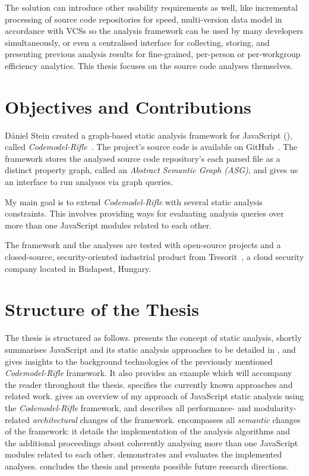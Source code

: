 The solution can introduce other usability requirements as well, like incremental processing of source code repositories for speed, multi-version data model in accordance with VCSs so the analysis framework can be used by many developers simultaneously, or even a centralised interface for collecting, storing, and presenting previous analysis results for fine-grained, per-person or per-workgroup efficiency analytics. This thesis focuses on the source code analyses themselves.


\section{Objectives and Contributions}

Dániel Stein created a graph-based static analysis framework for JavaScript (\es), called \emph{Codemodel-Rifle}~\cite{stein-daniel-msc}. The project's source code is available on GitHub~\cite{codemodel-rifle-github}. The framework stores the analysed source code repository's each parsed file as a distinct property graph, called an \emph{Abstract Semantic Graph (ASG)}, and gives us an interface to run analyses via graph queries.

My main goal is to extend \emph{Codemodel-Rifle} with several static analysis constraints. This involves providing ways for evaluating analysis queries over more than one JavaScript modules related to each other.

The framework and the analyses are tested with open-source projects and a closed-source, security-oriented industrial product from Tresorit~\cite{tresorit}, a cloud security company located in Budapest, Hungary.


\section{Structure of the Thesis}

The thesis is structured as follows. \emph{} presents the concept of static analysis, shortly summarises JavaScript and its static analysis approaches to be detailed in , and gives insights to the background technologies of the previously mentioned \emph{Codemodel-Rifle} framework. It also provides an example which will accompany the reader throughout the thesis. \emph{} specifies the currently known approaches and related work. \emph{} gives an overview of my approach of JavaScript static analysis using the \emph{Codemodel-Rifle} framework, and describes all performance- and modularity-related \emph{architectural} changes of the framework. \emph{} encompasses all \emph{semantic} changes of the framework: it details the implementation of the analysis algorithms and the additional proceedings about coherently analysing more than one JavaScript modules related to each other. \emph{} demonstrates and evaluates the implemented analyses. \emph{} concludes the thesis and presents possible future research directions.

